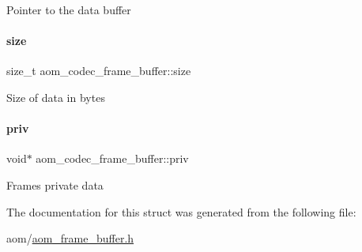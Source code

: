 Pointer to the data buffer \mbox{\label{structaom__codec__frame__buffer_a6fc24049c4e1706ce3a462825009f3d4}} 
\paragraph{\texorpdfstring{size}{size}}
{\footnotesize\ttfamily size\+\_\+t aom\+\_\+codec\+\_\+frame\+\_\+buffer\+::size}

Size of data in bytes \mbox{\label{structaom__codec__frame__buffer_aa689f8e27421eebc9e1c70b607e415ef}} 
\paragraph{\texorpdfstring{priv}{priv}}
{\footnotesize\ttfamily void$\ast$ aom\+\_\+codec\+\_\+frame\+\_\+buffer\+::priv}

Frame\textquotesingle{}s private data 

The documentation for this struct was generated from the following file\+:\begin{DoxyCompactItemize}
\item 
aom/\hyperlink{aom__frame__buffer_8h}{aom\+\_\+frame\+\_\+buffer.\+h}\end{DoxyCompactItemize}
